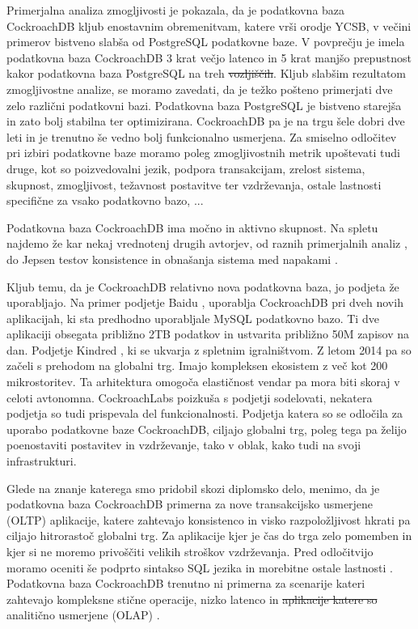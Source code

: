 \documentclass[a4paper, 12pt]{book}
\providecommand{\DIFaddtex}[1]{{\protect\color{blue}\uwave{#1}}} %
\providecommand{\DIFdeltex}[1]{{\protect\color{red}\sout{#1}}}                      %
\providecommand{\DIFaddbegin}{} %
\providecommand{\DIFaddend}{} %
\providecommand{\DIFdelbegin}{} %
\providecommand{\DIFdelend}{} %
\providecommand{\DIFadd}[1]{\texorpdfstring{\DIFaddtex{#1}}{#1}} %
\providecommand{\DIFdel}[1]{\texorpdfstring{\DIFdeltex{#1}}{}} %
\newcommand{\DIFscaledelfig}{0.5}
\newlength{\DIFdelgraphicswidth} %
\newlength{\DIFdelgraphicsheight} %
\newcommand{\DIFaddincludegraphics}[2][]{{\color{blue}\fbox{\DIFOincludegraphics[#1]{#2}}}} %
\newcommand{\DIFdelincludegraphics}[2][]{%
\sbox{\DIFdelgraphicsbox}{\DIFOincludegraphics[#1]{#2}}%
\settoboxwidth{\DIFdelgraphicswidth}{\DIFdelgraphicsbox} %
\settoboxtotalheight{\DIFdelgraphicsheight}{\DIFdelgraphicsbox} %
\scalebox{\DIFscaledelfig}{%
\parbox[b]{\DIFdelgraphicswidth}{\usebox{\DIFdelgraphicsbox}\\[-\baselineskip] \rule{\DIFdelgraphicswidth}{0em}}\llap{\resizebox{\DIFdelgraphicswidth}{\DIFdelgraphicsheight}{%
\setlength{\unitlength}{\DIFdelgraphicswidth}%
\begin{picture}(1,1)%
\thicklines\linethickness{2pt} %
{\color[rgb]{1,0,0}\put(0,0){\framebox(1,1){}}}%
{\color[rgb]{1,0,0}\put(0,0){\line( 1,1){1}}}%
{\color[rgb]{1,0,0}\put(0,1){\line(1,-1){1}}}%
\end{picture}%
}\hspace*{3pt}}} %
} %
\DeclareRobustCommand{\DIFaddbegin}{\DIFOaddbegin \let\includegraphics\DIFaddincludegraphics} %
\DeclareRobustCommand{\DIFaddend}{\DIFOaddend \let\includegraphics\DIFOincludegraphics} %
\DeclareRobustCommand{\DIFdelbegin}{\DIFOdelbegin \let\includegraphics\DIFdelincludegraphics} %
\DeclareRobustCommand{\DIFdelend}{\DIFOaddend \let\includegraphics\DIFOincludegraphics} %
\begin{document}
Primerjalna analiza zmogljivosti je pokazala, da je podatkovna baza Cock\-roachDB kljub enostavnim obremenitvam, katere vrši orodje YCSB, v večini primerov bistveno slabša od PostgreSQL podatkovne baze. V povprečju je imela podatkovna baza Cock\-roachDB 3 krat večjo latenco in 5 krat manjšo prepustnost kakor podatkovna baza PostgreSQL na treh \DIFdelbegin \DIFdel{vozljiščih}\DIFdelend \DIFaddbegin \DIFadd{vozliščih}\DIFaddend .
Kljub slabšim rezultatom zmogljivostne analize, se moramo zavedati, da je težko pošteno primerjati dve zelo različni podatkovni bazi. Podatkovna baza PostgreSQL je bistveno starejša in zato bolj stabilna ter optimizirana. CockroachDB pa je na trgu šele dobri dve leti in je trenutno še vedno bolj funkcionalno usmerjena. Za smiselno odločitev pri izbiri podatkovne baze moramo poleg zmogljivostnih metrik upoštevati tudi druge, kot so poizvedovalni jezik, podpora transakcijam, zrelost sistema, skupnost, zmogljivost, težavnost postavitve ter vzdrževanja, ostale lastnosti specifične za vsako podatkovno bazo, ...

Podatkovna baza CockroachDB ima močno in aktivno skupnost. Na spletu najdemo že kar nekaj vrednotenj drugih avtorjev, od raznih primerjalnih analiz \cite{kaur2017performance, Benchmarking-GCS-CRDB-NuoDB, CRDB-tpcc-vs-aurora, CRDB-2017}, do Jepsen testov konsistence in obnašanja sistema med napakami \cite{CRDB-jepsen, CRDB-jepsen-diy}.

Kljub temu, da je CockroachDB relativno nova podatkovna baza, jo podjeta že uporabljajo. Na primer podjetje Baidu \cite{crdb-baidu}, uporablja CockroachDB pri dveh novih aplikacijah, ki sta predhodno uporabljale MySQL podatkovno bazo. Ti dve aplikaciji obsegata približno 2TB podatkov in ustvarita približno 50M zapisov na dan. Podjetje Kindred \cite{crdb-kindred}, ki se ukvarja z spletnim igralništvom. Z letom 2014 pa so začeli s prehodom na globalni trg. Imajo kompleksen ekosistem z več kot 200 mikrostoritev. Ta arhitektura omogoča elastičnost vendar pa mora biti skoraj v celoti avtonomna. CockroachLabs poizkuša s podjetji sodelovati, nekatera podjetja so tudi prispevala del funkcionalnosti. Podjetja katera so se odločila za uporabo podatkovne baze CockroachDB, ciljajo globalni trg, poleg tega pa želijo poenostaviti postavitev in vzdrževanje, tako v oblak, kako tudi na svoji infrastrukturi.

Glede na znanje katerega smo pridobil skozi diplomsko delo, menimo, da je podatkovna baza CockroachDB primerna za nove transakcijsko usmerjene (OLTP) aplikacije, katere zahtevajo konsistenco in visko razpoložljivost hkrati pa ciljajo hitrorastoč globalni trg. Za aplikacije kjer je čas do trga zelo pomemben in kjer si ne moremo privoščiti velikih stroškov vzdrževanja. Pred odločitvijo moramo oceniti še podprto sintakso SQL jezika \cite{CRDB-sql-features} in morebitne ostale lastnosti \cite{CRDB-limitations}. Podatkovna baza CockroachDB trenutno ni primerna za scenarije kateri zahtevajo kompleksne stične operacije, nizko latenco in \DIFdelbegin \DIFdel{aplikacije katere so }\DIFdelend analitično usmerjene \DIFaddbegin \DIFadd{aplikacije }\DIFaddend (OLAP) \cite{CRDB-FAQ}.
\end{document}
